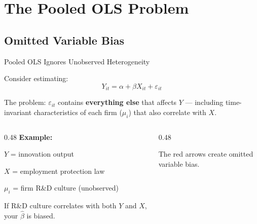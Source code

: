 \documentclass[9pt,aspectratio=169]{beamer}
\begin{document}
\section{The Pooled OLS Problem}
\subsection{Omitted Variable Bias}

\begin{frame}{Pooled OLS Ignores Unobserved Heterogeneity}

Consider estimating:
$$Y_{it} = \alpha + \beta X_{it} + \varepsilon_{it}$$

The problem: $\varepsilon_{it}$ contains \textbf{everything else} that affects $Y$ --- including time-invariant characteristics of each firm ($\mu_i$) that also correlate with $X$.

\bigskip

\begin{columns}[T]
\begin{column}{0.48\textwidth}
\textbf{Example:}
\bi
    \item $Y$ = innovation output
    \item $X$ = employment protection law
    \item $\mu_i$ = firm R\&D culture (unobserved)
\ei

\medskip

If R\&D culture correlates with both $Y$ and $X$, your $\hat{\beta}$ is \alert{biased}.
\end{column}
\begin{column}{0.48\textwidth}
\centering
{}

\smallskip

{\scriptsize The red arrows create \alert{omitted variable bias}.}
\end{column}
\end{columns}

\end{frame}
\end{document}
